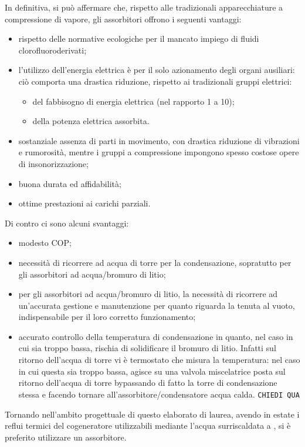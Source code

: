 In definitiva, si può affermare che, rispetto alle tradizionali apparecchiature a compressione di vapore, gli assorbitori offrono i seguenti vantaggi:
\begin{itemize}
	\item rispetto delle normative ecologiche per il mancato impiego di fluidi clorofluoroderivati;
	\item l'utilizzo dell'energia elettrica è per il solo azionamento degli organi ausiliari: ciò comporta una drastica riduzione, rispetto ai tradizionali gruppi elettrici:
	\begin{itemize}
		\item del fabbisogno di energia elettrica (nel rapporto \num{1} a \num{10});
		\item della potenza elettrica assorbita.
	\end{itemize}
	\item sostanziale assenza di parti in movimento, con drastica riduzione di vibrazioni e rumorosità, mentre i gruppi a compressione impongono spesso costose opere di insonorizzazione;
	\item buona durata ed affidabilità;
	\item ottime prestazioni ai carichi parziali.
\end{itemize}
Di contro ci sono alcuni svantaggi:
\begin{itemize}
	\item modesto COP;
	\item necessità di ricorrere ad acqua di torre per la condensazione, sopratutto per gli assorbitori ad acqua/bromuro di litio;
	\item per gli assorbitori ad acqua/bromuro di litio, la necessità di ricorrere ad un'accurata gestione e manutenzione per quanto riguarda la tenuta al vuoto, indispensabile per il loro corretto funzionamento;
	\item accurato controllo della temperatura di condensazione in quanto, nel caso in cui sia troppo bassa, rischia di solidificare il bromuro di litio. Infatti sul ritorno dell'acqua di torre vi è termostato che misura la temperatura: nel caso in cui questa sia troppo bassa, agisce su una valvola miscelatrice posta sul ritorno dell'acqua di torre bypassando di fatto la torre di condensazione stessa e facendo tornare all'assorbitore/condensatore acqua calda. \texttt{CHIEDI QUA}
\end{itemize}
Tornando nell'ambito progettuale di questo elaborato di laurea, avendo in estate i reflui termici del cogeneratore utilizzabili mediante l'acqua surriscaldata a , si è preferito utilizzare un assorbitore.

